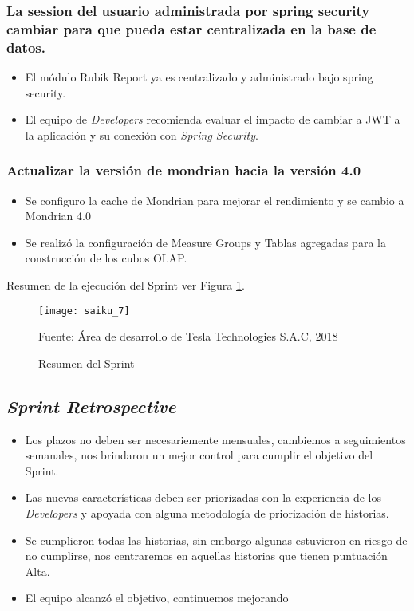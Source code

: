 \begin{spacing}{1.5}
		\subsubsection{La session del usuario administrada por spring security cambiar para que pueda estar centralizada en la base de datos.}
			\begin{itemize}
				\item El m\'{o}dulo Rubik Report ya es centralizado y administrado bajo spring security.
				\item El equipo de \textit{Developers} recomienda evaluar el impacto de cambiar a JWT a la aplicaci\'{o}n y su conexi\'{o}n con \textit{Spring Security}.
			\end{itemize}			
		\subsubsection{Actualizar la versi\'{o}n de mondrian hacia la versi\'{on 4.0}}
		
		\begin{itemize}
			\item Se configuro la cache de Mondrian para mejorar el rendimiento y se cambio a Mondrian 4.0
			\item Se realiz\'{o} la configuraci\'{o}n de Measure Groups y Tablas agregadas para la construcci\'{o}n de los cubos OLAP.
		\end{itemize}
	
		Resumen de la ejecuci\'{o}n del Sprint ver Figura \ref{figure:chaperIII_10}.
		
		\begin{figure}[H]
			\centering
			\texttt{[image: saiku\_7]}
			\caption {\centering \small{Resumen del Sprint}} \label{figure:chaperIII_10}
			\small {Fuente: \'{A}rea de desarrollo de Tesla Technologies S.A.C, 2018}
		\end{figure}
		
			
	\subsection{\textit{Sprint Retrospective}}
	\begin{itemize}
		\item Los plazos no deben ser necesariemente mensuales, cambiemos a seguimientos semanales, nos brindaron un mejor control para cumplir el objetivo del Sprint.
		\item Las nuevas caracter\'{i}sticas deben ser priorizadas con la experiencia de los \textit{Developers} y apoyada con alguna metodolog\'{i}a de priorizaci\'{o}n de historias.
		\item Se cumplieron todas las historias, sin embargo algunas estuvieron en riesgo de no cumplirse, nos centraremos en aquellas historias que tienen puntuaci\'{o}n Alta.
		\item El equipo alcanz\'{o} el objetivo, continuemos mejorando
	\end{itemize}


\end{spacing}
